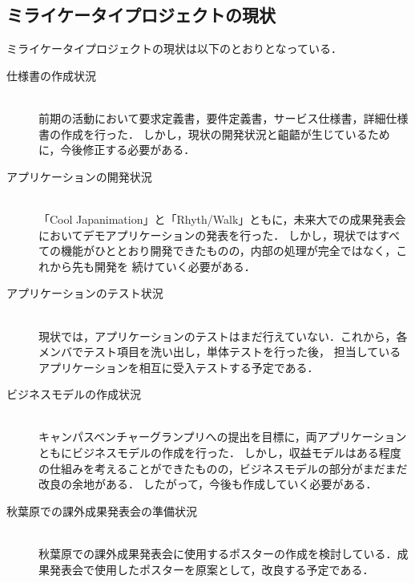 \subsection{ミライケータイプロジェクトの現状}

ミライケータイプロジェクトの現状は以下のとおりとなっている．

\begin{description}

\item[仕様書の作成状況]\mbox{}\\ 
前期の活動において要求定義書，要件定義書，サービス仕様書，詳細仕様書の作成を行った．
しかし，現状の開発状況と齟齬が生じているために，今後修正する必要がある．

\item[アプリケーションの開発状況]\mbox{}\\ 
「Cool Japanimation」と「Rhyth/Walk」ともに，未来大での成果発表会においてデモアプリケーションの発表を行った．
しかし，現状ではすべての機能がひととおり開発できたものの，内部の処理が完全ではなく，これから先も開発を
続けていく必要がある．

\item[アプリケーションのテスト状況]\mbox{}\\ 
現状では，アプリケーションのテストはまだ行えていない．これから，各メンバでテスト項目を洗い出し，単体テストを行った後，
担当しているアプリケーションを相互に受入テストする予定である．

\item[ビジネスモデルの作成状況]\mbox{}\\ 
キャンパスベンチャーグランプリへの提出を目標に，両アプリケーションともにビジネスモデルの作成を行った．
しかし，収益モデルはある程度の仕組みを考えることができたものの，ビジネスモデルの部分がまだまだ改良の余地がある．
したがって，今後も作成していく必要がある．

\item[秋葉原での課外成果発表会の準備状況]\mbox{}\\ 
秋葉原での課外成果発表会に使用するポスターの作成を検討している．成果発表会で使用したポスターを原案として，改良する予定である．

\end{description}
